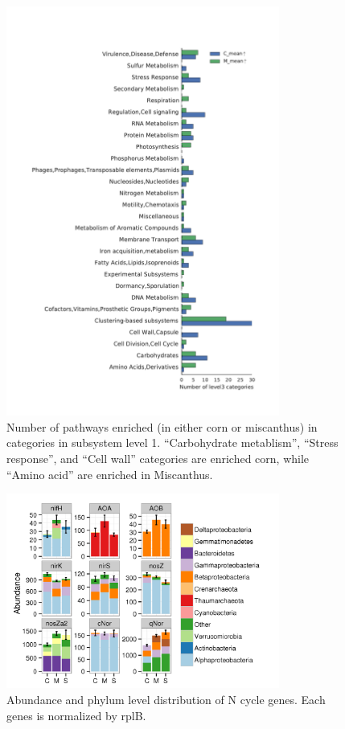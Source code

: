 \documentclass[12pt]{article}
\begin{document}
    \begin{figure}[tbph!]
    \centering
    \includegraphics[width=0.8\textwidth]{figures/subsys-enrich-CvM}
    \caption[Number of pathways enriched in categories in subsystem level 1]{Number of pathways enriched (in either corn or miscanthus) in categories in subsystem level 1. ``Carbohydrate metablism'', ``Stress response'', and ``Cell wall'' categories are enriched corn, while ``Amino acid'' are enriched in Miscanthus.}
    \label{fig:subsys-enrich-CvM}
    \end{figure}



    \begin{figure}[tbph!]
    \centering
    \includegraphics[width=0.8\textwidth]{figures/xander-ncycle-abun}
    \caption[Abundance and phylum level distribution of N cycle genes]{Abundance and phylum level distribution of N cycle genes. Each genes is normalized by rplB.}
    \label{fig:xander-ncycle-abun}
    \end{figure}
\end{document}
